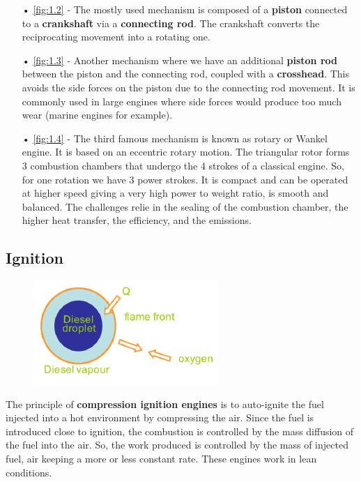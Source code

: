 		\begin{itemize}
		\item[•]\autoref{fig:1.2} - The mostly used mechanism is composed of a \textbf{piston} connected to a \textbf{crankshaft} via a \textbf{connecting rod}. The crankshaft converts the reciprocating movement into a rotating one.\\
		\item[•]\autoref{fig:1.3} - Another mechanism where we have an additional \textbf{piston rod} between the piston and the connecting rod, coupled with a \textbf{crosshead}. This avoids the side forces on the piston due to the connecting rod movement. It is commonly used in large engines where side forces would produce too much wear (marine engines for example). \\
		\item[•]\autoref{fig:1.4} - The third famous mechanism is known as rotary or Wankel engine. It is based on an eccentric rotary motion. The triangular rotor forms 3 combustion chambers that undergo the 4 strokes of a classical engine. So, for one rotation we have 3 power strokes. It is compact and can be operated at higher speed giving a very high power to weight ratio, is smooth and balanced. The challenges relie in
the sealing of the combustion chamber, the higher heat transfer, the efficiency, and the emissions.
		\end{itemize}
		
	\subsection{Ignition}
		\begin{figure}
		\vspace{-5mm}
		\includegraphics[scale=0.6]{ch1/5}
		\label{fig:1.5}
		\end{figure}
		The principle of \textbf{compression ignition engines} is to auto-ignite the fuel injected into a hot environment by compressing the air. Since the fuel is introduced close to ignition, the combustion is controlled by the mass diffusion of the fuel into the air. So, the work produced is controlled by the mass of injected fuel, air keeping a more or less constant rate. These engines work in lean conditions. 
		\ \\
		
